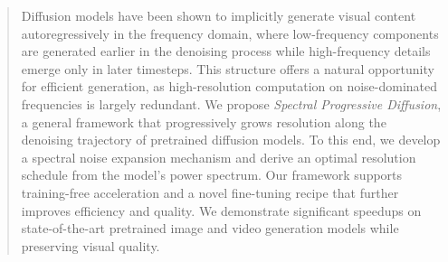 \begin{abstract}
Diffusion models have been shown to implicitly generate visual content autoregressively in the frequency domain, where low-frequency components are generated earlier in the denoising process while high-frequency details emerge only in later timesteps. 
This structure offers a natural opportunity for efficient generation, as high-resolution computation on noise-dominated frequencies is largely redundant.
We propose \emph{Spectral Progressive Diffusion}, a general framework that progressively grows resolution along the denoising trajectory of pretrained diffusion models. 
To this end, we develop a spectral noise expansion mechanism and derive an optimal resolution schedule from the model's power spectrum. Our framework supports training-free acceleration and a novel fine-tuning recipe that further improves efficiency and quality.
We demonstrate significant speedups on state-of-the-art pretrained image and video generation models while preserving visual quality.


\end{abstract}
